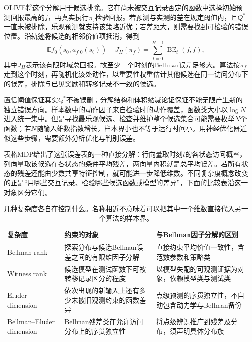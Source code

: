 OLIVE将这个分解用于候选排除。它在尚未被交互记录否定的函数中选择初始预测回报最高的$f$，再真实执行$\pi_f$检验回报。若预测与实测的差在规定阈值内，且$Q^*$一直未被排除，乐观预测就支持该策略近优；若差距大，则需要找到可检验的错误位置。沿轨迹将候选的相邻价值项抵消，得到
\[
 \mathbb E f_0(s_0,a_{f,0}(s_0))-J_H(\pi_f)
                 =\sum_{t=0}^{H-1}\operatorname{BE}_t(f,f),
\]
其中$J_H$表示该有限时域总回报。故至少一个时刻的Bellman误差足够大。算法按$\pi_f$走到这个时刻，再随机化该处动作，以重要性权重估计其他候选在同一访问分布下的误差，排除与已见奖励和转移记录不一致的候选。

置信阈值保证真实$Q^*$不被误删；分解结构和体积缩减论证保证不能无限产生新的独立错误方向。样本数中的动作因子来自检验时的动作覆盖，函数类大小以$\log N$进入统一集中。但是寻找最乐观候选、检查并维护整个候选集合可能需要枚举$N$个函数；若$N$随输入维数指数增长，样本界小也不等于运行时间小。用神经优化器近似这些步骤，需要额外分析优化与判别误差。

表格MDP给出了这张误差表的一种直接分解：行向量取时刻$t$的各状态访问概率，列向量取该候选在各状态的条件平均残差，两向量内积就是总平均误差。若所有状态的残差还能由少数共享特征控制，就可能进一步降低维数。不同复杂度概念改变的正是“用哪些交互记录、检验哪些候选函数或模型的差异”，下面的比较表沿这一对象区分它们。

\begin{table}[t]
  \centering
  \small
  \begin{tabularx}{\linewidth}{>{\raggedright\arraybackslash}p{28mm} >{\raggedright\arraybackslash}X >{\raggedright\arraybackslash}X}
    \toprule
    复杂度 & 约束的对象 & 与Bellman因子分解的区别 \\
    \midrule
    Bellman rank & 探索分布与候选Bellman误差之间的有限维因子分解 & 直接约束平均价值一致性，含范数参数和策略类 \\
    Witness rank & 候选模型在测试函数下可被转移记录区分的程度 & 以模型失配的可观测证据为对象，依赖模型类与测试类 \\
    Eluder dimension & 依次出现的新输入上还有多少未被旧观测约束的函数差异 & 点级预测的序贯独立性，不自动包含动力学与Bellman备份 \\
    Bellman--Eluder dimension & Bellman残差类在允许访问分布上的序贯独立性 & 将点级辨识推广到残差及分布，须声明具体分布族 \\
    \bottomrule
  \end{tabularx}
  \caption{几种复杂度各自在控制什么。名称相近不意味着可以把其中一个维数直接代入另一个算法的样本界。}
  \label{tab:rl-learning-function-complexities}
\end{table}

